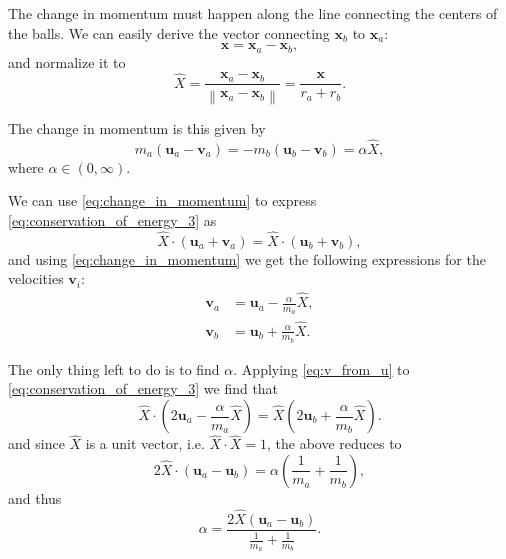 \documentclass{article}
\renewcommand{\vec}[1]{\bm{#1}}
\begin{document}
\begin{enumerate}
        The change in momentum must happen along the line connecting the centers of the balls. We can easily derive the vector connecting $\vec{x}_{b}$ to $\vec{x}_{a}$:
        \begin{equation}
            \vec{x} = \vec{x}_{a}-\vec{x}_{b},
            \label{eq:connect_x1_x2}
        \end{equation}
        and normalize it to
        \begin{equation}
            \hat{X} = \frac{\vec{x}_{a}-\vec{x}_{b}}{\left\|\vec{x}_{a}-\vec{x}_{b} \right\|} = \frac{\vec{x}}{r_{a}+r_{b}}.
            \label{eq:unit_connect_x1_x2}
        \end{equation}

        The change in momentum is this given by
        \begin{equation}
            m_{a}\left( \vec{u}_{a}-\vec{v}_{a} \right) = -m_{b}\left( \vec{u}_{b}-\vec{v}_{b} \right) = \alpha\hat{X},
            \label{eq:change_in_momentum}
        \end{equation}
        where $\alpha\in\left(0, \infty\right)$.

        We can use \autoref{eq:change_in_momentum} to express \autoref{eq:conservation_of_energy_3} as
        \begin{equation}
            \hat{X}\cdot\left(\vec{u}_{a}+\vec{v}_{a}\right) = \hat{X}\cdot\left(\vec{u}_{b}+\vec{v}_{b}\right),
            \label{eq:label}
        \end{equation}
        and using \autoref{eq:change_in_momentum} we get the following expressions for the velocities $\vec{v}_{i}$:
        \begin{align}
            \vec{v}_{a} &= \vec{u}_{a} - \frac{\alpha}{m_{a}}\hat{X},\nonumber\\
            \vec{v}_{b} &= \vec{u}_{b} + \frac{\alpha}{m_{b}}\hat{X}.
            \label{eq:v_from_u}
        \end{align}

        The only thing left to do is to find $\alpha$. Applying \autoref{eq:v_from_u} to \autoref{eq:conservation_of_energy_3} we find that
        \begin{equation}
            \hat{X}\cdot\left(2\vec{u}_{a}-\frac{\alpha}{m_{a}}\hat{X}\right) = \hat{X}\left(2\vec{u}_{b}+\frac{\alpha}{m_{b}}\hat{X}\right).
            \label{eq:find_alpha}
        \end{equation}
        and since $\hat{X}$ is a unit vector, i.e. $\hat{X}\cdot\hat{X}=1$, the above reduces to
        \begin{equation}
        2\hat{X}\cdot\left(\vec{u}_{a}-\vec{u}_{b}\right) = \alpha\left(\frac{1}{m_{a}}+\frac{1}{m_{b}}\right),
            \label{eq:reduction_1}
        \end{equation}
        and thus
        \begin{equation}
        \alpha = \frac{2\hat{X}\left(\vec{u}_{a}-\vec{u}_{b}\right)}{\frac{1}{m_{a}}+\frac{1}{m_{b}}}.
            \label{eq:reduction_2}
        \end{equation}


\end{enumerate}
\end{document}
